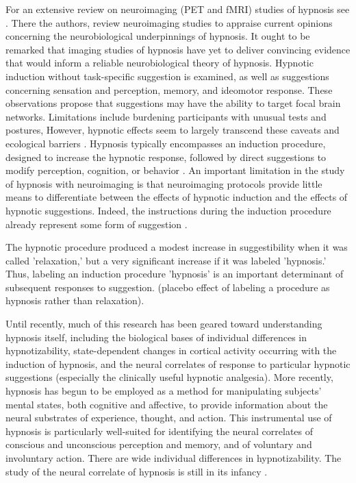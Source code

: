 \documentclass[11pt, onecolumn]{article}
\begin{document}
For an extensive review on neuroimaging (PET and fMRI) studies of hypnosis see \citep{landry_hypnosis_2015}. There the authors, review 
neuroimaging studies to appraise current opinions concerning the neurobiological underpinnings of hypnosis. It ought to be remarked that 
imaging studies of hypnosis have yet to deliver convincing evidence that would inform a reliable neurobiological theory of hypnosis.
Hypnotic induction without task-specific suggestion is examined, as well as suggestions concerning sensation and perception, memory, and ideomotor response.
These observations propose that suggestions may have the ability to target focal brain networks.
Limitations include burdening participants with unusual tests and postures, However, hypnotic effects seem to largely transcend these caveats and ecological barriers \citep{landry_hypnosis_2015}.
Hypnosis typically encompasses an induction procedure, designed to increase the hypnotic response, followed by direct suggestions to modify perception, cognition, or behavior \citep{Kihlstrom, 2008}.
An important limitation in the study of hypnosis with neuroimaging is that neuroimaging protocols provide little means to differentiate between the effects of hypnotic induction and the effects of hypnotic suggestions. Indeed, the instructions during the induction procedure already represent some form of suggestion \citep{gandhi_does_2005}.

The hypnotic procedure produced a modest increase in suggestibility when it was called 'relaxation,' but a very significant increase if it was labeled 'hypnosis.' 
Thus, labeling an induction procedure 'hypnosis' is an important determinant of subsequent responses to suggestion. (placebo effect of labeling a procedure as hypnosis rather than relaxation).

\citep{kihlstrom_neuro-hypnotism:_2013}
Until recently, much of this research has been geared toward
understanding hypnosis itself, including the biological bases of individual differences in hypnotizability, state-dependent changes in cortical activity occurring with the induction of hypnosis, and the neural correlates of response to particular hypnotic suggestions (especially the clinically useful hypnotic analgesia). More recently, hypnosis has begun to
be employed as a method for manipulating subjects’ mental states, both cognitive and affective, to provide information about the neural substrates of experience, thought, and action. This instrumental use of hypnosis is particularly well-suited for identifying the neural correlates of conscious and unconscious perception and memory, and of voluntary and involuntary action.
There are wide individual differences in hypnotizability.
The study of the neural correlate of hypnosis is still in its infancy \citep{kihlstrom_neuro-hypnotism:_2013}.
\end{document}
